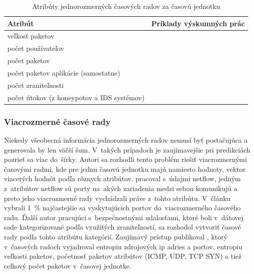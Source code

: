 \documentclass[thesismargins, thesislinespacing, openright, upjsfrontpage]{rnthesis}
\begin{document}
\begin{table}[]
    \centering
    \begin{tabular}{ | p{6cm} | p{8cm} | }
        \hline \textbf{Atribút} & \textbf{Príklady výskumných prác} \\
        \hline
        \hline veľkosť paketov & \cite{jiang2004detecting, wei2012intrusion,madan2018predicting, sang2002predictability,wang2008internet,hasegawa2001applications,cortez2012multi,papagiannaki2005long} \\
        \hline počet používateľov & \cite{jiang2004detecting} \\
        \hline počet paketov & \cite{jiang2004detecting} \\
        \hline počet paketov aplikácie \newline (samostatne) & \cite{jiang2004detecting} \\
        \hline počet zraniteľnosti & \cite{tang2016exploiting,roumani2015time,tang2018disclosure,tang2017big,pokhrel2017cybersecurity,werner2017time} \\
        \hline počet útokov \newline (z honeypotov a IDS systémov) & \cite{fang2019deep,zhan2015predicting,condon2008analysis} \\
        \hline
    \end{tabular}
    \caption{Atribúty jednorozmerných časových radov za časovú jednotku}
    \label{tab:ts_uni}
\end{table}

\subsubsection{Viacrozmerné časové rady}

Niekedy všeobecná informácia jednorozmerných radov nemusí byť postačujúca a generovala by len väčší šum. V~takých prípadoch je zaujímavejšie pri predikciách pozrieť sa viac do~šírky. Autori \cite{shin2013advanced,ramaki2015real,marchette1999statistical} sa rozhodli tento problém riešiť viacrozmernými časovými radmi, kde pre jednu časovú jednotku majú namiesto hodnoty, vektor viacerých hodnôt podľa rôznych atribútov. \cite{marchette1999statistical} pracoval s~údajmi netflow, jedným z~atribútov netflow sú porty na~akých zariadenia medzi sebou komunikujú a preto jeho viacrozmerné rady vychádzali práve z~tohto atribútu. V~článku vybrali 1~\% najčastejšie sa vyskytujúcich portov do~viacrozmerného časového radu. Ďalší autor pracujúci s~bezpečnostnými udalosťami, ktoré boli v~dátovej sade kategorizované podľa využitých zraniteľností, sa rozhodol vytvoriť časové rady podľa tohto atribútu kategórií. Zaujímavý prístup publikoval \cite{shin2013advanced}, ktorý v~časových radoch vyjadroval entropiu zdrojových ip adries a portov, entropiu veľkosti paketov, početnosť paketov atribútov (ICMP, UDP, TCP SYN) a tiež celkový počet paketov v~časovej jednotke.
\end{document}
